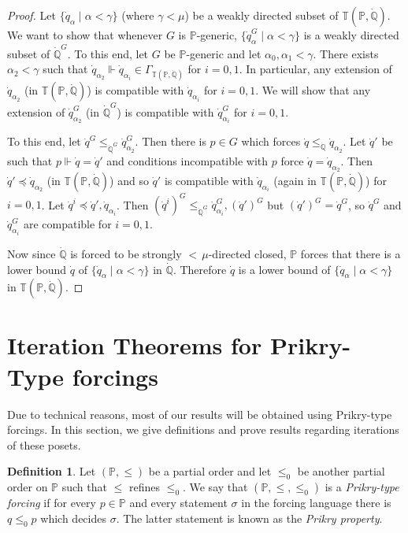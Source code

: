 \documentclass[a4paper]{amsart}
\theoremstyle{definition}
\newtheorem{mydef}{Definition}[section]
\theoremstyle{remark}
\theoremstyle{plain}
\numberwithin{mydef}{section}
\newcommand{\dP}{\mathbb{P}}
\newcommand{\dQ}{\mathbb{Q}}
\newcommand{\dT}{\mathbb{T}}
\begin{document}
	\begin{proof}
		Let $\{\dot{q}_{\alpha}\;|\;\alpha<\gamma\}$ (where $\gamma<\mu$) be a weakly directed subset of $\dT(\dP,\dot{\dQ})$. We want to show that whenever $G$ is $\dP$-generic, $\{\dot{q}_{\alpha}^G\;|\;\alpha<\gamma\}$ is a weakly directed subset of $\dot{\dQ}^G$. To this end, let $G$ be $\dP$-generic and let $\alpha_0,\alpha_1<\gamma$. There exists $\alpha_2<\gamma$ such that $\dot{q}_{\alpha_2}\Vdash\dot{q}_{\alpha_i}\in\Gamma_{\dT(\dP,\dot{\dQ})}$ for $i=0,1$. In particular, any extension of $\dot{q}_{\alpha_2}$ (in $\dT(\dP,\dot{\dQ})$) is compatible with $\dot{q}_{\alpha_i}$ for $i=0,1$. We will show that any extension of $\dot{q}_{\alpha_2}^G$ (in $\dot{\dQ}^G$) is compatible with $\dot{q}_{\alpha_i}^G$ for $i=0,1$.
		
		To this end, let $\dot{q}^G\leq_{\dot{\dQ}^G}\dot{q}_{\alpha_2}^G$. Then there is $p\in G$ which forces $\dot{q}\leq_{\dot{\dQ}}\dot{q}_{\alpha_2}$. Let $\dot{q}'$ be such that $p\Vdash\dot{q}=\dot{q}'$ and conditions incompatible with $p$ force $\dot{q}=\dot{q}_{\alpha_2}$. Then $\dot{q}'\preceq\dot{q}_{\alpha_2}$ (in $\dT(\dP,\dot{\dQ})$) and so $\dot{q}'$ is compatible with $\dot{q}_{\alpha_i}$ (again in $\dT(\dP,\dot{\dQ})$) for $i=0,1$. Let $\dot{q}^i\preceq\dot{q}',\dot{q}_{\alpha_i}$. Then $(\dot{q}^i)^G\leq_{\dot{\dQ}^G}\dot{q}_{\alpha_i}^G,(\dot{q}')^G$ but $(\dot{q}')^G=\dot{q}^G$, so $\dot{q}^G$ and $\dot{q}_{\alpha_i}^G$ are compatible for $i=0,1$.
		
		Now since $\dot{\dQ}$ is forced to be strongly ${<}\,\mu$-directed closed, $\dP$ forces that there is a lower bound $\dot{q}$ of $\{\dot{q}_{\alpha}\;|\;\alpha<\gamma\}$ in $\dot{\dQ}$. Therefore $\dot{q}$ is a lower bound of $\{\dot{q}_{\alpha}\;|\;\alpha<\gamma\}$ in $\dT(\dP,\dot{\dQ})$.
	\end{proof}
	
	\section{Iteration Theorems for Prikry-Type forcings}
	
	Due to technical reasons, most of our results will be obtained using Prikry-type forcings. In this section, we give definitions and prove results regarding iterations of these posets.
	
	\begin{mydef}
		Let $(\dP,\leq)$ be a partial order and let $\leq_0$ be another partial order on $\dP$ such that $\leq$ refines $\leq_0$. We say that $(\dP,\leq,\leq_0)$ is a \emph{Prikry-type forcing} if for every $p\in\dP$ and every statement $\sigma$ in the forcing language there is $q\leq_0p$ which decides $\sigma$. The latter statement is known as the \emph{Prikry property}.
	\end{mydef}
	
\end{document}
